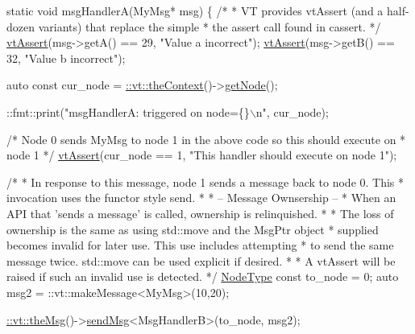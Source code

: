 \begin{DoxyCodeInclude}
\textcolor{keyword}{static} \textcolor{keywordtype}{void} msgHandlerA(MyMsg* msg) \{
  \textcolor{comment}{/*}
\textcolor{comment}{   * VT provides vtAssert (and a half-dozen variants) that replace the simple}
\textcolor{comment}{   * the assert call found in cassert.}
\textcolor{comment}{   */}
  \hyperlink{config__assert_8h_aeddd4990a496e91a0ca5d6c16437359b}{vtAssert}(msg->getA() == 29, \textcolor{stringliteral}{"Value a incorrect"});
  \hyperlink{config__assert_8h_aeddd4990a496e91a0ca5d6c16437359b}{vtAssert}(msg->getB() == 32, \textcolor{stringliteral}{"Value b incorrect"});

  \textcolor{keyword}{auto} \textcolor{keyword}{const} cur\_node = \hyperlink{namespacevt_a26551fe0e6e6a1371111df5b12c7e92c}{::vt::theContext}()->\hyperlink{structvt_1_1ctx_1_1_context_a0d52c263ce8516546a67443d9a86fa5f}{getNode}();

  ::fmt::print(\textcolor{stringliteral}{"msgHandlerA: triggered on node=\{\}\(\backslash\)n"}, cur\_node);

  \textcolor{comment}{/* Node 0 sends MyMsg to node 1 in the above code so this should execute on}
\textcolor{comment}{   * node 1 */}
  \hyperlink{config__assert_8h_aeddd4990a496e91a0ca5d6c16437359b}{vtAssert}(cur\_node == 1, \textcolor{stringliteral}{"This handler should execute on node 1"});

  \textcolor{comment}{/*}
\textcolor{comment}{   * In response to this message, node 1 sends a message back to node 0. This}
\textcolor{comment}{   * invocation uses the functor style send.}
\textcolor{comment}{   *}
\textcolor{comment}{   * -- Message Ownsership --}
\textcolor{comment}{   * When an API that 'sends a message' is called, ownership is relinquished.}
\textcolor{comment}{   *}
\textcolor{comment}{   * The loss of ownership is the same as using std::move and the MsgPtr object}
\textcolor{comment}{   * supplied becomes invalid for later use. This use includes attempting}
\textcolor{comment}{   * to send the same message twice. std::move can be used explicit if desired.}
\textcolor{comment}{   *}
\textcolor{comment}{   * A vtAssert will be raised if such an invalid use is detected.}
\textcolor{comment}{   */}
  \hyperlink{namespacevt_a866da9d0efc19c0a1ce79e9e492f47e2}{NodeType} \textcolor{keyword}{const} to\_node = 0;
  \textcolor{keyword}{auto} msg2 = ::vt::makeMessage<MyMsg>(10,20);

  \hyperlink{namespacevt_aeafd31f866aeb4dc6fc2f6ee97136350}{::vt::theMsg}()->\hyperlink{group__preregister_ga0162a39473e7f9b490a79a7983d949ac}{sendMsg}<MsgHandlerB>(to\_node, msg2);


\end{DoxyCodeInclude}
